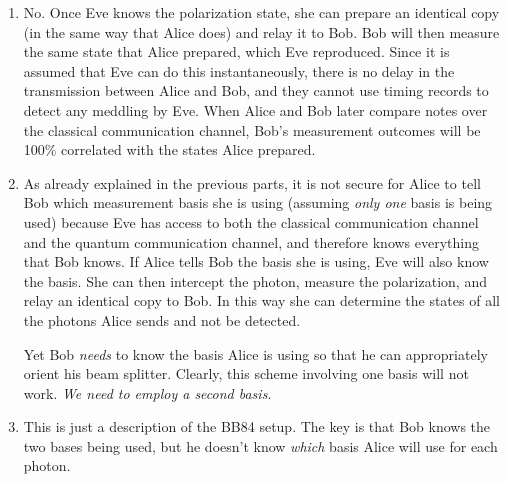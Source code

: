 \documentclass[12pt]{article}
\begin{document}
\begin{enumerate}[label=\textbf{\alph*.}]
    \item No. Once Eve knows the polarization state, she can prepare an identical copy (in the same way that Alice does) and relay it to Bob. Bob will then measure the same state that Alice prepared, which Eve reproduced. Since it is assumed that Eve can do this instantaneously, there is no delay in the transmission between Alice and Bob, and they cannot use timing records to detect any meddling by Eve. When Alice and Bob later compare notes over the classical communication channel, Bob's measurement outcomes will be 100\% correlated with the states Alice prepared.
    
    \item As already explained in the previous parts, it is not secure for Alice to tell Bob which measurement basis she is using (assuming \emph{only one} basis is being used) because Eve has access to both the classical communication channel and the quantum communication channel, and therefore knows everything that Bob knows. If Alice tells Bob the basis she is using, Eve will also know the basis. She can then intercept the photon, measure the polarization, and relay an identical copy to Bob. In this way she can determine the states of all the photons Alice sends and not be detected.
    
    Yet Bob \emph{needs} to know the basis Alice is using so that he can appropriately orient his beam splitter. Clearly, this scheme involving one basis will not work. \emph{We need to employ a second basis.}
    
    \item This is just a description of the BB84 setup. The key is that Bob knows the two bases being used, but he doesn't know \emph{which} basis Alice will use for each photon.
    

\end{enumerate}
\end{document}
